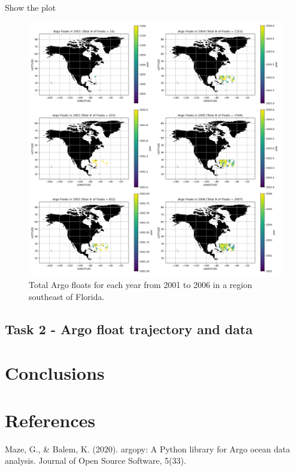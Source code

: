\documentclass{article}
\begin{document}
Show the plot

\begin{figure}[total_argo]
 \includegraphics[width=\textwidth,height=\textheight,keepaspectratio]{total_argo.png}
 \caption{Total Argo floats for each year from 2001 to 2006 in a region southeast of Florida.}
 
\end{figure}

\subsection{Task 2 - Argo float trajectory and data}



\section{Conclusions}

\section{References}

Maze, G., & Balem, K. (2020). argopy: A Python library for Argo ocean data analysis. Journal of Open Source Software, 5(33).
\end{document}
